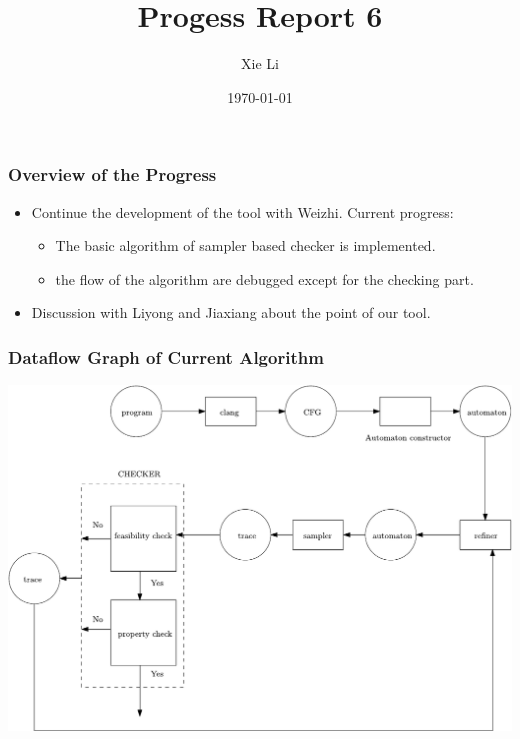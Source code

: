 \documentclass[11pt]{beamer}
\title{Progess Report 6}
\date{\today}
\author{Xie Li}
\begin{document}
\maketitle

\begin{frame}\frametitle{Overview of the Progress}
\begin{itemize}
\item Continue the development of the tool with Weizhi. Current progress:
\begin{itemize}
\item The basic algorithm of sampler based checker is implemented.
\item the flow of the algorithm are debugged except for the checking part.
\end{itemize}
\item Discussion with Liyong and Jiaxiang about the point of our tool.

\end{itemize}

\end{frame}

\begin{frame}\frametitle{Dataflow Graph of Current Algorithm}
\begin{center}
\includegraphics[scale=.5]{flowgraph.pdf}
\end{center}
\end{frame}


\begin{frame}\frametitle{}

\end{frame}
\end{document}
